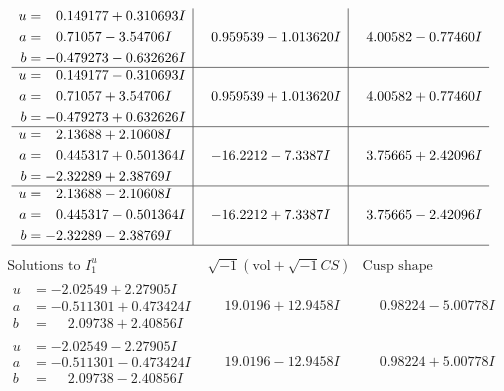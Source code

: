 \documentclass[1p]{elsarticle_modified}
\theoremstyle{definition}
\newcommand{\I}{\sqrt{-1}}
\begin{document}
$$\begin{array}{c|c|c}
\begin{aligned}
u &= \phantom{-}0.149177 + 0.310693 I \\
a &= \phantom{-}0.71057 - 3.54706 I \\
b &= -0.479273 - 0.632626 I\end{aligned}
 & \phantom{-}0.959539 - 1.013620 I & \phantom{-}4.00582 - 0.77460 I \\ \hline\begin{aligned}
u &= \phantom{-}0.149177 - 0.310693 I \\
a &= \phantom{-}0.71057 + 3.54706 I \\
b &= -0.479273 + 0.632626 I\end{aligned}
 & \phantom{-}0.959539 + 1.013620 I & \phantom{-}4.00582 + 0.77460 I \\ \hline\begin{aligned}
u &= \phantom{-}2.13688 + 2.10608 I \\
a &= \phantom{-}0.445317 + 0.501364 I \\
b &= -2.32289 + 2.38769 I\end{aligned}
 & -16.2212 - 7.3387 I & \phantom{-}3.75665 + 2.42096 I \\ \hline\begin{aligned}
u &= \phantom{-}2.13688 - 2.10608 I \\
a &= \phantom{-}0.445317 - 0.501364 I \\
b &= -2.32289 - 2.38769 I\end{aligned}
 & -16.2212 + 7.3387 I & \phantom{-}3.75665 - 2.42096 I\\
 \hline 
 \end{array}$$\newpage$$\begin{array}{c|c|c}  
\text{Solutions to }I^u_{1}& \I (\text{vol} + \sqrt{-1}CS) & \text{Cusp shape}\\
 \hline 
\begin{aligned}
u &= -2.02549 + 2.27905 I \\
a &= -0.511301 + 0.473424 I \\
b &= \phantom{-}2.09738 + 2.40856 I\end{aligned}
 & \phantom{-}19.0196 + 12.9458 I & \phantom{-}0.98224 - 5.00778 I \\ \hline\begin{aligned}
u &= -2.02549 - 2.27905 I \\
a &= -0.511301 - 0.473424 I \\
b &= \phantom{-}2.09738 - 2.40856 I\end{aligned}
 & \phantom{-}19.0196 - 12.9458 I & \phantom{-}0.98224 + 5.00778 I \\ \hline\begin{aligned}

\end{aligned}
\end{array}$$
\end{document}
